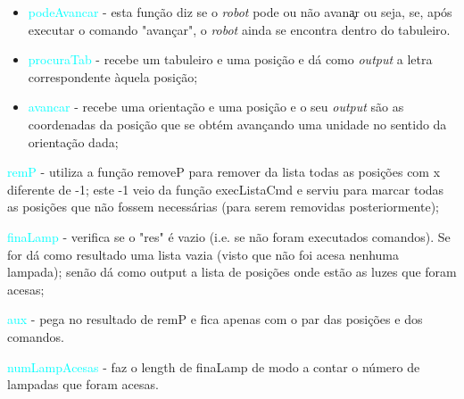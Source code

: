 \documentclass[12pt,a4paper]{article}
\begin{document}
\begin{itemize}
{\begin{itemize}
\begin{itemize}
\item \textcolor{cyan}{podeAvancar} - esta fun\c{c}ão diz se o \textit{robot} pode ou não avan\c{a}r ou seja, se, após executar o comando "avan\c{c}ar", o \textit{robot} ainda se encontra dentro do tabuleiro.
\item \textcolor{cyan}{procuraTab} - recebe um tabuleiro e uma posi\c{c}ão e dá como \textit{output} a letra correspondente àquela posi\c{c}ão;
\item \textcolor{cyan}{avancar} - recebe uma orienta\c{c}ão e uma posi\c{c}ão e o seu \textit{output} são as coordenadas da posi\c{c}ão que se obtém avan\c{c}ando uma unidade no sentido da orienta\c{c}ão dada;
\end{itemize}
\end{itemize}
\item \textcolor{cyan}{remP} - utiliza a função removeP para remover da lista todas as posições com x diferente de -1; este -1 veio da função execListaCmd e serviu para marcar todas as posições que não fossem necessárias (para serem removidas posteriormente);
\item \textcolor{cyan}{finaLamp} - verifica se o "res" é vazio (i.e. se não foram executados comandos). Se for dá como resultado uma lista vazia (visto que não foi acesa nenhuma lampada); senão dá como output a lista de posições onde estão as luzes que foram acesas;
\item \textcolor{cyan}{aux} - pega no resultado de remP e fica apenas com o par das posições e dos comandos.
\item \textcolor{cyan}{numLampAcesas} - faz o length de finaLamp de modo a contar o número de lampadas que foram acesas.}
\end{itemize}

\newpage
\end{document}

